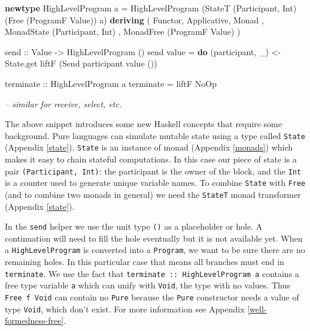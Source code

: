 \documentclass[runningheads,plain]{llncs}
\newenvironment{Shaded}{}{}
\newcommand{\KeywordTok}[1]{\textcolor[rgb]{0.00,0.44,0.13}{\textbf{#1}}}
\newcommand{\DataTypeTok}[1]{\textcolor[rgb]{0.56,0.13,0.00}{#1}}
\newcommand{\CommentTok}[1]{\textcolor[rgb]{0.38,0.63,0.69}{\textit{#1}}}
\newcommand{\OtherTok}[1]{\textcolor[rgb]{0.00,0.44,0.13}{#1}}
\newcommand{\FunctionTok}[1]{\textcolor[rgb]{0.02,0.16,0.49}{#1}}
\newcommand{\NormalTok}[1]{#1}
\begin{document}
\begin{Shaded}
\begin{Highlighting}[]
\KeywordTok{newtype} \DataTypeTok{HighLevelProgram}\NormalTok{ a }\FunctionTok{=} \DataTypeTok{HighLevelProgram} 
\NormalTok{    (}\DataTypeTok{StateT}\NormalTok{ (}\DataTypeTok{Participant}\NormalTok{, }\DataTypeTok{Int}\NormalTok{) (}\DataTypeTok{Free}\NormalTok{ (}\DataTypeTok{ProgramF} \DataTypeTok{Value}\NormalTok{)) a)}
    \KeywordTok{deriving} 
\NormalTok{        ( }\DataTypeTok{Functor}\NormalTok{, }\DataTypeTok{Applicative}\NormalTok{, }\DataTypeTok{Monad}
\NormalTok{        , }\DataTypeTok{MonadState}\NormalTok{ (}\DataTypeTok{Participant}\NormalTok{, }\DataTypeTok{Int}\NormalTok{)}
\NormalTok{        , }\DataTypeTok{MonadFree}\NormalTok{ (}\DataTypeTok{ProgramF} \DataTypeTok{Value}\NormalTok{)}
\NormalTok{        )}

\OtherTok{send ::} \DataTypeTok{Value} \OtherTok{->} \DataTypeTok{HighLevelProgram}\NormalTok{ ()}
\NormalTok{send value }\FunctionTok{=} \KeywordTok{do}
\NormalTok{    (participant, _) }\OtherTok{<-}\NormalTok{ State.get}
\NormalTok{    liftF (}\DataTypeTok{Send}\NormalTok{ participant value ())  }

\OtherTok{terminate ::} \DataTypeTok{HighLevelProgram}\NormalTok{ a}
\NormalTok{terminate }\FunctionTok{=}\NormalTok{ liftF }\DataTypeTok{NoOp}

\CommentTok{-- similar for receive, select, etc.}
\end{Highlighting}
\end{Shaded}

The above snippet introduces some new Haskell concepts that require some
background. Pure languages can simulate mutable state using a type
called \texttt{State} (Appendix \ref{state}). \texttt{State} is an
instance of monad (Appendix \ref{monads}) which makes it easy to chain
stateful computations. In this case our piece of state is a pair
\texttt{(Participant,\ Int)}: the participant is the owner of the block,
and the \texttt{Int} is a counter used to generate unique variable
names. To combine \texttt{State} with \texttt{Free} (and to combine two
monads in general) we need the \texttt{StateT} monad transformer
(Appendix \ref{state}).

In the \texttt{send} helper we use the unit type \texttt{()} as a
placeholder or hole. A continuation will need to fill the hole
eventually but it is not available yet. When a \texttt{HighLevelProgram}
is converted into a \texttt{Program}, we want to be sure there are no
remaining holes. In this particular case that means all branches must
end in \texttt{terminate}. We use the fact that
\texttt{terminate\ ::\ HighLevelProgram\ a} contains a free type
variable \texttt{a} which can unify with \texttt{Void}, the type with no
values. Thus \texttt{Free\ f\ Void} can contain no \texttt{Pure} because
the \texttt{Pure} constructor needs a value of type \texttt{Void}, which
don't exist. For more information see Appendix
\ref{well-formedness-free}.
\end{document}
